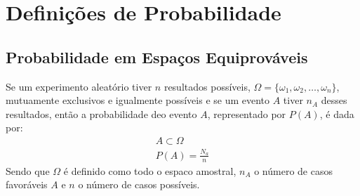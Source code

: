 \documentclass[11pt,a4paper]{book}
\begin{document}
\section{Definições de Probabilidade}
\subsection{Probabilidade em Espaços Equiprováveis}
Se um experimento aleatório tiver $n$ resultados possíveis, $\Omega = \{ \omega_1,\omega_2,\ldots,\omega_n \}$, mutuamente exclusivos e igualmente possíveis e se um evento $A$ tiver $n_A$ desses resultados, então a probabilidade deo evento $A$, representado por $P(A)$, é dada por: 
\begin{align}
  A \subset \Omega \nonumber\\
  P(A)= \frac{N_a}{n} 
\end{align}
Sendo que $\Omega$ é definido como todo o espaco amostral, $n_A$ o número de casos favoráveis $A$ e $n$ o número de casos possíveis.
\end{document}
